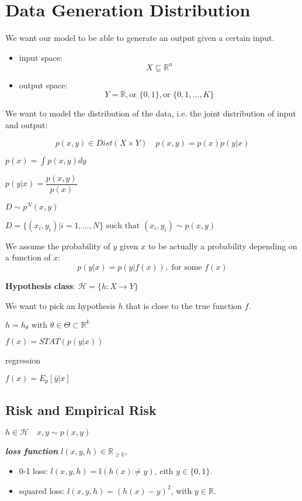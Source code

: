 \newpage
\chapter{Data Generation Distribution}

We want our model to be able to generate an output given a certain input.

\begin{itemize}
    \item input space:
    $$X \subseteq \mathbb{R}^n$$
    \item output space:
    $$Y = \mathbb{R}, \text{or } \{0,1\}, \text{or } \{0,1,\ldots,K\}$$
\end{itemize}

We want to model the distribution of the data, i.e. the joint distribution of input and output:

$$
p(x,y) \in Dist(X\times Y) \quad p(x,y) = p(x) p(y|x)
$$

$p(x) = \int p(x,y) dy$

$p(y|x) = \dfrac{p(x,y)}{p(x)}$

$D \sim p^N(x,y)$

$D = \{(x_i, y_i) | i = 1, \dots, N\} \text{ such that } (x_i, y_i) \sim p(x,y)$

We assume the probability of $y$ given $x$ to be actually a probability depending on a function of $x$:
$$p(y|x) = p(y|f(x)), \text{ for some } f(x)$$

\textbf{Hypothesis class}: $\mathcal{H} = \{h:X\rightarrow Y\}$

We want to pick an hypothesis $h$ that is close to the true function $f$.

$h = h_\theta \text{ with } \theta \in \Theta \subset \mathbb{R}^k$

$f(x) = STAT(p(y|x))$

regression

$f(x) = E_p [\bar y | x]$

\section{Risk and Empirical Risk}

$h \in \mathcal{H} \quad x,y \sim p(x,y)$

\textbf{\textit{loss function}} $l(x,y,h) \in \mathbb{R_{\ge 0}}$, 

\begin{itemize}
    \item 0-1 loss: $l(x,y,h) = \mathbb{I}(h(x) \neq y)$, eith $y \in \{0, 1\}$.
    \item squared loss: $l(x,y,h) = (h(x) - y)^2$, with $y \in \mathbb{R}$.
\end{itemize}

